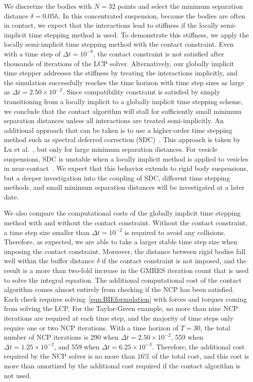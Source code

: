 \documentclass[AMA,STIX1COL]{WileyNJD-v2}
\begin{document}
We discretize the bodies with $N=32$ points and select the minimum
separation distance $\delta=0.05h$.   In this concentrated
suspension, because the bodies are often in contact, we expect that the
interactions lead to stiffness if the locally semi-implicit time
stepping method is used.  To demonstrate this stiffness, we apply the
locally semi-implicit time stepping method with the contact constraint.
Even with a time step of $\Delta t = 10^{-8}$, the contact constraint is
not satisfied after thousands of iterations of the LCP solver.
Alternatively, our globally implicit time stepper addresses the
stiffness by treating the interactions implicitly, and the simulation
successfully reaches the time horizon with time step sizes as large as
$\Delta t = 2.50 \times 10^{-2}$.  Since compatibility constraint is
satisfied by simply transitioning from a locally implicit to a globally
implicit time stepping scheme, we conclude that the contact algorithm
will stall for sufficiently small minimum separation distances unless
all interactions are treated semi-implicitly.  An additional approach
that can be taken is to use a higher-order time stepping method such as
spectral deferred correction (SDC)~\cite{qua-bir2016}.  This approach is
taken by Lu et al.~\cite{Lu2017}, but only for large minimum separation
distances.  For vesicle suspensions, SDC is unstable when a locally
implicit method is applied to vesicles in
near-contact~\cite{qua-bir2016}. We expect that this behavior extends to
rigid body suspensions, but a deeper investigation into the coupling of
SDC, different time stepping methods, and small minimum separation
distances will be investigated at a later date.

We also compare the computational costs of the globally implicit time
stepping method with and without the contact constraint.  Without the
contact constraint, a time step size smaller than $\Delta t = 10^{-2}$
is required to avoid any collisions.  Therefore, as expected, we are
able to take a larger stable time step size when imposing the contact
constraint.  Moreover, the distance between rigid bodies fall well
within the buffer distance $\delta$ if the contact constraint is not
imposed, and the result is a more than two-fold increase in the GMRES
iteration count that is used to solve the integral equation.  The
additional computational cost of the contact algorithm comes almost
entirely from checking if the NCP has been satisfied.  Each check
requires solving~\eqref{eqn:BIEformulation} with forces and torques
coming from solving the LCP.  For the Taylor-Green example, no more than
nine NCP iterations are required at each time step, and the majority of
time steps only require one or two NCP iterations.  With a time horizon
of $T=30$, the total number of NCP iterations is 290 when $\Delta t =
2.50 \times 10^{-2}$, 559 when $\Delta t = 1.25 \times 10^{-2}$, and 559
when $\Delta t = 6.25 \times 10^{-3}$.  Therefore, the additional cost
required by the NCP solver is no more than $16\%$ of the total cost, and
this cost is more than amortized by the additional cost required if the
contact algorithm is not used.
\end{document}
